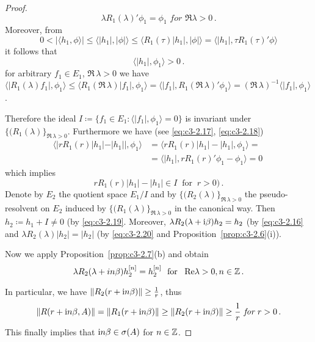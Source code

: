\begin{proof}
\begin{equation}\label{eq:c3-2.18}
\lambda R_{1}(\lambda)'\phi_{1} = \phi_{1} \textit{ for } \Re\lambda > 0\,.
\end{equation} 
Moreover, from 
\[
0 < |\langle h_{1},\phi \rangle| \leq \langle |h_{1}|,|\phi| \rangle \leq \langle R_{1}(\tau)|h_{1}|,|\phi| \rangle = \langle |h_{1}|,\tau R_{1}(\tau)'\phi \rangle 
\]
it follows that
%
%
%
\begin{equation}\label{eq:c3-2.19}
		\langle |h_{1}|,\phi_{1} \rangle > 0\,.
\end{equation}
for arbitrary $f_{1} \in E_{1}$, $\Re\, \lambda > 0$ we have $\langle |R_{1}(\lambda)f_{1}|,\phi_{1} \rangle \leq \langle R_{1}(\Re\,\lambda)|f_{1}|,\phi_{1} \rangle = \langle |f_{1}|,R_{1}(\Re\,\lambda)'\phi_{1} \rangle = (\Re\,\lambda)^{-1}\langle |f_{1}|,\phi_{1} \rangle$.

Therefore the ideal $I \coloneqq \{f_{1} \in E_{1} : \langle |f_{1}|,\phi_{1} \rangle = 0\}$ is invariant under $\{(R_{1}(\lambda)\}_{\Re\,\lambda>0}$.
Furthermore we have (see \eqref{eq:c3-2.17}, \eqref{eq:c3-2.18}) 
\begin{align*}
	\langle |rR_{1}(r)|h_{1}| - |h_{1}||,\phi_{1} \rangle &= \langle rR_{1}(r)|h_{1}| - |h_{1}|,\phi_{1} \rangle = \\
	& = \langle |h_{1}|,rR_{1}(r)'\phi_{1} - \phi_{1} \rangle = 0\ 
\end{align*}	
which implies
\begin{equation}\label{eq:c3-2.20}
rR_{1}(r)|h_{1}| - |h_{1}| \in I \ \text{ for } \ r > 0)\,.
\end{equation}
Denote by $E_{2}$ the quotient space $E_{1}/I$ and by $\{(R_{2}(\lambda)\}_{\Re\,\lambda>0}$ the pseudo-resolvent on $E_{2}$ induced by $\{(R_{1}(\lambda)\}_{\Re\,\lambda>0}$ in the canonical way. 
Then $h_{2} \coloneqq h_{1} + I \neq 0$ (by \eqref{eq:c3-2.19}.
Moreover, $\lambda R_{2}(\lambda+\mathrm{i}\beta)h_{2} = h_{2}$ (by \eqref{eq:c3-2.16} and $\lambda R_{2}(\lambda)|h_{2}| = |h_{2}|$ (by \eqref{eq:c3-2.20} and Proposition~\ref{prop:c3-2.6}(i)).

Now we apply Proposition~\ref{prop:c3-2.7}(b) and obtain
\begin{equation}\label{eq:c3-2.21}
	\lambda R_{2}(\lambda+in\beta)h_{2}^{[n]} = h_{2}^{[n]}\ \text{ for } \ \mathop{}\!\mathrm{Re}\lambda > 0 , n \in \mathbb{Z}\,.
\end{equation}

In particular, we have $\|R_{2}(r+\mathrm{i} n\beta)\| \geq \frac{1}{r}$, thus 
\[
\|R(r+\mathrm{i} n\beta,A)\| = \|R_{1}(r+\mathrm{i} n\beta)\| \geq \|R_{2}(r+\mathrm{i} n\beta)\| \geq \frac{1}{r} \textit{ for } r > 0\,.
\]
This finally implies that $ \mathrm{i} n\beta \in \sigma(A)$ for $n \in \mathbb{Z}$.
\end{proof}

